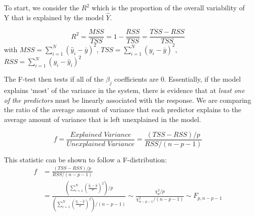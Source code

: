 \documentclass{article}
\begin{document}
To start, we consider the $R^2$ which is the proportion of the overall variability of Y that is explained by the model $\hat{Y}$.

$$
R^2 = \frac{MSS}{TSS} = 1 - \frac{RSS}{TSS} = \frac{TSS - RSS}{TSS}
$$
with $MSS = \sum\limits_{i=1}^{N}(\hat{y}_i - \bar{y})^2$, $TSS = \sum\limits_{i=1}^{N}(y_i - \bar{y})^2$, $RSS = \sum\limits_{i=1}^{N}(y_i - \hat{y}_i)^2$

The F-test then tests if all of the $\beta_j$ coefficients are 0. Essentially, if the model explains `most' of the variance in the system, there is evidence that at \textit{least one of the predictors} must be linearly associated with the response. We are comparing the ratio of the average amount of variance that each predictor explains to the average amount of variance that is left unexplained in the model.

\begin{equation}\label{eq:f-stat}
f = \frac{\textit{Explained Variance}}{\textit{Unexplained Variance}} = \frac{(TSS - RSS)/p}{RSS/(n-p-1)}
\end{equation}

This statistic can be shown to follow a F-distribution:
\begin{align*}\label{eq:f-stat-derivation}
f &= \frac{(TSS - RSS)/p}{RSS/(n-p-1)}\\
&=  \frac{(\sum\limits_{i=1}^{N}(\frac{\hat{y}_i - \bar{y}}{\sigma})^2)/p}{(\sum\limits_{i=1}^{N}(\frac{y_i - \bar{y}}{\sigma})^2)/(n-p-1)} \sim \frac{\chi^2_{p}/p}{\chi^2_{n-p-1}/(n-p-1)} \sim F_{p, n-p-1}
\end{align*}
\end{document}
